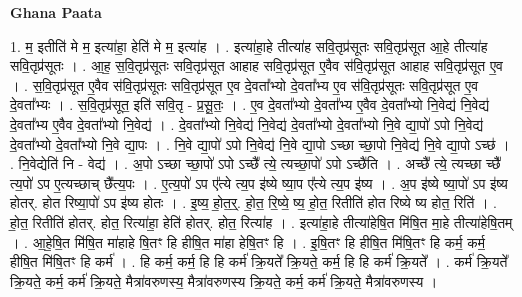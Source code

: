\documentclass[17pt]{extarticle}
\begin{document}
\textbf{Ghana Paata } \newline

1. म॒ इतीति॑ मे म॒ इत्या॑हा॒ हेति॑ मे म॒ इत्या॑ह । . इत्या॑हा॒हे तीत्या॑ह सवि॒तृप्र॑सूतः सवि॒तृप्र॑सूत आ॒हे तीत्या॑ह सवि॒तृप्र॑सूतः । . आ॒ह॒ स॒वि॒तृप्र॑सूतः सवि॒तृप्र॑सूत आहाह सवि॒तृप्र॑सूत ए॒वैव स॑वि॒तृप्र॑सूत आहाह सवि॒तृप्र॑सूत ए॒व । . स॒वि॒तृप्र॑सूत ए॒वैव स॑वि॒तृप्र॑सूतः सवि॒तृप्र॑सूत ए॒व दे॒वता᳚भ्यो दे॒वता᳚भ्य ए॒व स॑वि॒तृप्र॑सूतः सवि॒तृप्र॑सूत ए॒व दे॒वता᳚भ्यः । . स॒वि॒तृप्र॑सूत॒ इति॑ सवि॒तृ - प्र॒सू॒तः॒ । . ए॒व दे॒वता᳚भ्यो दे॒वता᳚भ्य ए॒वैव दे॒वता᳚भ्यो नि॒वेद्य॑ नि॒वेद्य॑ दे॒वता᳚भ्य ए॒वैव दे॒वता᳚भ्यो नि॒वेद्य॑ । . दे॒वता᳚भ्यो नि॒वेद्य॑ नि॒वेद्य॑ दे॒वता᳚भ्यो दे॒वता᳚भ्यो नि॒वे द्या॒पो॑ ऽपो नि॒वेद्य॑ दे॒वता᳚भ्यो दे॒वता᳚भ्यो नि॒वे द्या॒पः । . नि॒वे द्या॒पो॑ ऽपो नि॒वेद्य॑ नि॒वे द्या॒पो ऽच्छा च्छा॒पो नि॒वेद्य॑ नि॒वे द्या॒पो ऽच्छ॑ । . नि॒वेद्येति॑ नि - वेद्य॑ । . अ॒पो ऽच्छा च्छा॒पो॑ ऽपो ऽच्छै᳚ त्ये॒ त्यच्छा॒पो॑ ऽपो ऽच्छै॑ति । . अच्छै᳚ त्ये॒ त्यच्छा च्छै᳚ त्य॒पो॑ ऽप ए॒त्यच्छाच् छै᳚त्य॒पः । . ए॒त्य॒पो॑ ऽप ए᳚त्ये त्य॒प इ॑ष्ये ष्या॒प ए᳚त्ये त्य॒प इ॑ष्य । . अ॒प इ॑ष्ये ष्या॒पो॑ ऽप इ॑ष्य होतर्. होत रिष्या॒पो॑ ऽप इ॑ष्य होतः । . इ॒ष्य॒ हो॒त॒र्॒. हो॒त॒ रि॒ष्ये॒ ष्य॒ हो॒त॒ रितीति॑ होत रिष्ये ष्य होत॒ रिति॑ । . हो॒त॒ रितीति॑ होतर्. होत॒ रित्या॑हा॒ हेति॑ होतर्. होत॒ रित्या॑ह । . इत्या॑हा॒हे तीत्या॑हेषि॒त मि॑षि॒त मा॒हे तीत्या॑हेषि॒तम् । . आ॒हे॒षि॒त मि॑षि॒त मा॑हाहे षि॒तꣳ हि हीषि॒त मा॑हा हेषि॒तꣳ हि । . इ॒षि॒तꣳ हि हीषि॒त मि॑षि॒तꣳ हि कर्म॒ कर्म॒ हीषि॒त मि॑षि॒तꣳ हि कर्म॑ । . हि कर्म॒ कर्म॒ हि हि कर्म॑ क्रि॒यते᳚ क्रि॒यते॒ कर्म॒ हि हि कर्म॑ क्रि॒यते᳚ । . कर्म॑ क्रि॒यते᳚ क्रि॒यते॒ कर्म॒ कर्म॑ क्रि॒यते॒ मैत्रा॑वरुणस्य॒ मैत्रा॑वरुणस्य क्रि॒यते॒ कर्म॒ कर्म॑ क्रि॒यते॒ मैत्रा॑वरुणस्य । \newline
\end{document}
